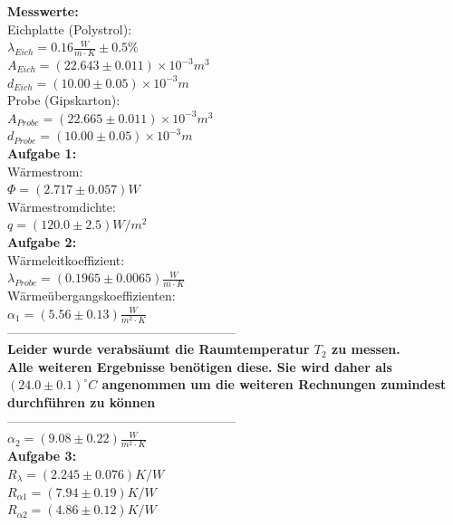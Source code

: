 \documentclass[12pt,a4paper]{article}
\begin{document}
\begin{multicols}{2}

\noindent \textbf{Messwerte:}\\
\noindent Eichplatte (Polystrol):\\
$\lambda_{Eich} = 0.16 \frac{W}{m \cdot K}\pm 0.5\%$\\
$A_{Eich}=(22.643 \pm 0.011)\times 10^{-3}m^3 $\\
$d_{Eich}=(10.00 \pm 0.05)\times 10^{-3}m$\\

\noindent Probe (Gipskarton):\\
$A_{Probe}=(22.665 \pm 0.011)\times 10^{-3}m^3$\\
$d_{Probe}=(10.00 \pm 0.05)\times 10^{-3}m$\\

\noindent \textbf{Aufgabe 1:}\\
Wärmestrom:\\
$\Phi = (2.717 \pm 0.057)W$\\
Wärmestromdichte:\\
$q=(120.0 \pm 2.5)W/m^2$\\

\noindent \textbf{Aufgabe 2:}\\
Wärmeleitkoeffizient:\\
$\lambda_{Probe}=(0.1965 \pm 0.0065)\frac{W}{m \cdot K}$\\
Wärmeübergangskoeffizienten:\\
$\alpha_1=(5.56 \pm 0.13 )\frac{W}{m^2 \cdot K}$\\

\noindent------------------------------------------------------\\
\noindent \textbf{Leider wurde verabsäumt die Raumtemperatur $T_2$ zu messen.\\
Alle weiteren Ergebnisse benötigen diese. Sie wird daher als $(24.0\pm0.1)^\circ C$ angenommen um die weiteren Rechnungen zumindest durchführen zu können}\\
------------------------------------------------------\\




\noindent $\alpha_2=(9.08 \pm 0.22 )\frac{W}{m^2 \cdot K}$\\

\noindent \textbf{Aufgabe 3:}\\
$R_{\lambda}=(2.245 \pm 0.076)K/W$\\
$R_{\alpha1}=(7.94 \pm 0.19)K/W$\\
$R_{\alpha2}=(4.86 \pm 0.12)K/W$\\


\end{multicols}
\end{document}
